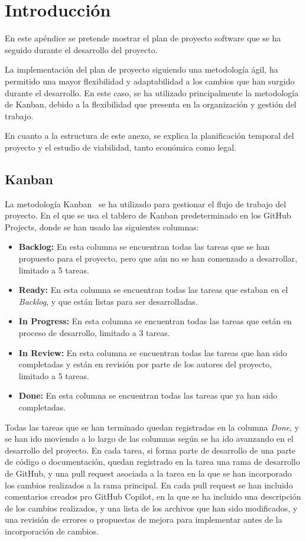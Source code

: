 
\section{Introducción}
En este apéndice se pretende mostrar el plan de proyecto software que se ha seguido durante el desarrollo del proyecto.

La implementación del plan de proyecto siguiendo una metodología ágil, ha permitido una mayor flexibilidad y adaptabilidad a los cambios que han surgido durante el desarrollo. En este caso, se ha utilizado principalmente la metodología de Kanban, debido a la flexibilidad que presenta en la organización y gestión del trabajo.

En cuanto a la estructura de este anexo, se explica la planificación temporal del proyecto y el estudio de viabilidad, tanto económica como legal. 

\subsection{Kanban}
La metodología Kanban~\cite{JuliaMartins2025} se ha utilizado para gestionar el flujo de trabajo del proyecto. En el que se usa el tablero de Kanban predeterminado en los GitHub Projects, donde se han usado las siguientes columnas:
\begin{itemize}
    \item \textbf{Backlog:} En esta columna se encuentran todas las tareas que se han propuesto para el proyecto, pero que aún no se han comenzado a desarrollar, limitado a 5 tareas.
    \item \textbf{Ready:} En esta columna se encuentran todas las tareas que estaban en el \textit{Backlog}, y que están listas para ser desarrolladas.
    \item \textbf{In Progress:} En esta columna se encuentran todas las tareas que están en proceso de desarrollo, limitado a 3 tareas.
    \item \textbf{In Review:} En esta columna se encuentran todas las tareas que han sido completadas y están en revisión por parte de los autores del proyecto, limitado a 5 tareas.
    \item \textbf{Done:} En esta columna se encuentran todas las tareas que ya han sido completadas.
\end{itemize}

Todas las tareas que se han terminado quedan registradas en la columna \textit{Done}, y se han ido moviendo a lo largo de las columnas según se ha ido avanzando en el desarrollo del proyecto. En cada tarea, si forma parte de desarrollo de una parte de código o documentación, quedan registrado en la tarea una rama de desarrollo de GitHub, y una pull request asociada a la tarea en la que se han incorporado los cambios realizados a la rama principal. En cada pull request se han incluido comentarios creados pro GitHub Copilot, en la que se ha incluido una descripción de los cambios realizados, y una lista de los archivos que han sido modificados, y una revisión de errores o propuestas de mejora para implementar antes de la incorporación de cambios.

